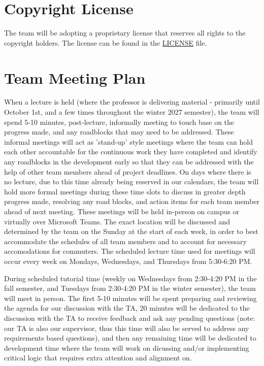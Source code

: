 \documentclass{article}
\begin{document}

\section{Copyright License}

The team will be adopting a proprietary license that reserves all rights to the 
copyright holders. The license can be found in the \href{LICENSE}{LICENSE} file.


\section{Team Meeting Plan}

When a lecture is held (where the professor is delivering material - primarily 
until October 1st, and a few times throughout the winter 2027 semester), the team 
will spend 5-10 minutes, post-lecture, informally meeting to touch base on the
progress made, and any roadblocks that may need to be addressed. These informal 
meetings will act as 'stand-up' style meetings where the team can hold each other
accountable for the continuous work they have completed and identify any roadblocks
in the development early so that they can be addressed with the help of other team 
members ahead of project deadlines. On days where there is no lecture, due to 
this time already being reserved in our calendars, the team will hold more formal  
meetings during these time slots to discuss in greater depth progress made, resolving 
any road blocks, and action items for each team member ahead of next meeting. These 
meetings will be held in-person on campus or virtually over Microsoft Teams. The 
exact location will be discussed and determined by the team on the Sunday at the 
start of each week, in order to best accommodate the schedules of all team members 
and to account for necessary accomodations for commuters. The scheduled lecture 
time used for meetings will occur every week on Mondays, Wednesdays, and Thursdays from 
5:30-6:20 PM.

During scheduled tutorial time (weekly on Wednesdays from 2:30-4:20 PM in the fall semester, 
and Tuesdays from 2:30-4:20 PM in the winter semester), the team will meet in person. 
The first 5-10 minutes will be spent preparing and reviewing the agenda for our 
discussion with the TA, 20 minutes will be dedicated to the discussion with the 
TA to receive feedback and ask any pending questions (note: our TA is also our 
supervisor, thus this time will also be served to address any requirements based 
questions), and then any remaining time will be dedicated to development time 
where the team will work on dicussing and/or implementing critical logic that requires 
extra attention and alignment on.
\end{document}
